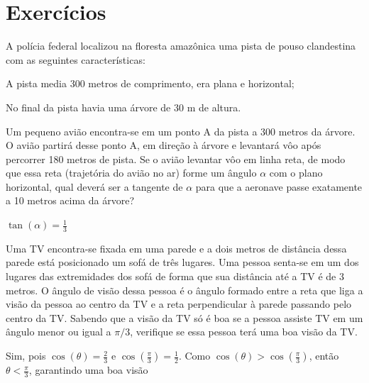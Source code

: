 \section{Exercícios}

\begin{exercises*}

\begin{exercise}
  A polícia federal localizou na floresta amazônica uma pista de pouso
  clandestina com as seguintes características:
  \begin{alphalist}
    \item A pista media 300 metros de comprimento, era plana e horizontal;
    \item No final da pista havia uma árvore de 30 m de altura.
  \end{alphalist}
  Um pequeno avião encontra-se em um ponto A da pista a 300 metros da árvore. O
  avião partirá desse ponto A, em direção à árvore e levantará vôo após
  percorrer 180 metros de pista. Se o avião levantar vôo em linha reta, de
  modo que essa reta (trajetória do avião no ar) forme um ângulo $\alpha$ com
  o plano horizontal, qual deverá ser a tangente de $\alpha$ para que a
  aeronave passe exatamente a 10 metros acima da árvore?

  \begin{answer}
    $\tan(\alpha)= \frac{1}{3}$
  \end{answer}
\end{exercise}

\begin{exercise}
  Uma TV encontra-se fixada em uma parede e a dois metros de distância
  dessa parede está posicionado um sofá de três lugares. Uma pessoa senta-se em
  um dos lugares das extremidades dos sofá de forma que sua distância até a
  TV é de 3 metros. O ângulo de visão dessa pessoa é o ângulo formado entre a
  reta que liga a visão da pessoa ao centro da TV e a reta perpendicular à
  parede passando pelo centro da TV. Sabendo que a visão da TV só é boa se a
  pessoa assiste TV em um ângulo menor ou igual a $\pi/3$, verifique se essa
  pessoa terá uma boa visão da TV.

  \begin{answer}
    Sim, pois $\cos(\theta) = \frac{2}{3}$ e
    $\cos\left(\frac{\pi}{3}\right) = \frac{1}{2}$. Como $\cos(\theta) >
    \cos\left(\frac{\pi}{3}\right)$, então $\theta < \frac{\pi}{3}$,
    garantindo uma boa visão
  \end{answer}
\end{exercise}


\end{exercises*}
